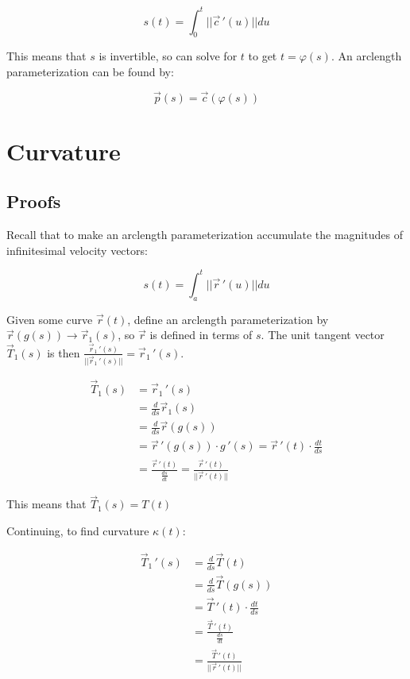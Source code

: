 \[s(t)=\int_0^t||\vec{c}\,'(u)||du\]

\noindent
This means that $s$ is invertible, so can solve for $t$ to get $t=\varphi(s)$.
An arclength parameterization can be found by:

\[\boxed{\vec{p}(s)=\vec{c}(\varphi(s))}\]

\section{Curvature}

\subsection{Proofs}

Recall that to make an arclength parameterization accumulate the magnitudes of infinitesimal velocity vectors:

\[s(t)=\int_a^t ||\vec{r}\,'(u)||du\]

Given some curve $\vec{r}(t)$, define an arclength parameterization by $\vec{r}(g(s))\rightarrow \vec{r}_1(s)$, so 
$\vec{r}$ is defined in terms of $s$. The unit tangent vector $\vec{T}_1(s)$ is then $\frac{\vec{r}_1\,'(s)}{||\vec{r}_1\,'(s)||}=\vec{r}_1\,'(s)$.

\begin{align*}
    \vec{T}_1(s)&=\vec{r}_1\,'(s)\\
    &=\frac{d}{ds}\vec{r}_1(s)\\
    &=\frac{d}{ds}\vec{r}(g(s))\\
    &=\vec{r}\,'(g(s))\cdot g\,'(s)=\vec{r}\,'(t)\cdot \frac{dt}{ds}\\
    &=\frac{\vec{r}\,'(t)}{\frac{ds}{dt}}=\frac{\vec{r}\,'(t)}{||\vec{r}\,'(t)||}
\end{align*}

This means that $\vec{T}_1(s)=T(t)$

Continuing, to find curvature $\kappa(t)$:

\begin{align*}
    \vec{T}_1\,'(s)&=\frac{d}{ds}\vec{T}(t)\\
    &=\frac{d}{ds}\vec{T}(g(s))\\
    &=\vec{T}\,'(t)\cdot \frac{dt}{ds}\\
    &=\frac{\vec{T}\,'(t)}{\frac{ds}{dt}}\\
    &=\frac{\vec{T}\,'(t)}{||\vec{r}\,'(t)||}\\
\end{align*}

